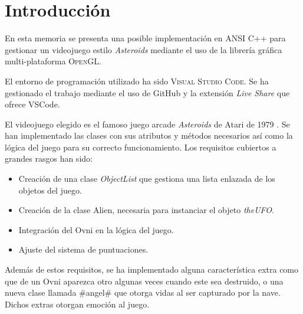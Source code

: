 \section{Introducción}

En esta memoria se presenta una posible implementación en ANSI C++ para gestionar un videojuego estilo \emph{Asteroids} mediante el uso de la librería gráfica multi-plataforma \textsc{OpenGL}.

El entorno de programación utilizado ha sido \textsc{Visual Studio Code}. Se ha gestionado el trabajo mediante el uso de GitHub y la extensión \emph{Live Share} que ofrece VSCode.

El videojuego elegido es el famoso juego arcade \emph{Asteroids} de Atari de 1979 \cite{wiki_atari}. Se han implementado las clases con sus atributos y métodos necesarios así como la lógica del juego para su correcto funcionamiento.
Los requisitos cubiertos a grandes rasgos han sido:
\begin{itemize}
    \item Creación de una clase \emph{ObjectList} que gestiona una lista enlazada de los objetos del juego.
    \item Creación de la clase Alien, necesaria para instanciar el objeto \emph{theUFO}.
    \item Integración del Ovni en la lógica del juego.
    \item Ajuste del sistema de puntuaciones.
\end{itemize}

Además de estos requisitos, se ha implementado alguna característica extra como que de un Ovni aparezca otro algunas veces cuando este sea destruido, o una nueva clase llamada \#angel\# que otorga vidas al ser capturado por la nave. Dichos extras otorgan emoción al juego.

